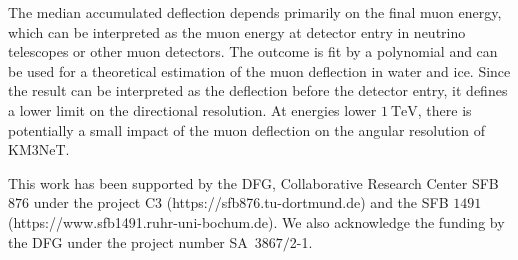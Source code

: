 The median accumulated deflection depends primarily on the final muon energy, which can be interpreted as the muon energy at detector entry 
in neutrino telescopes or other muon detectors.
The outcome is fit by a polynomial and can be used for 
a theoretical estimation of the muon deflection in water and ice.
Since the result can be interpreted as the deflection before the detector entry, it defines a lower limit on the directional resolution.
At energies lower $\SI{1}{\tera\electronvolt}$, there is potentially a small impact of the muon deflection on the angular 
resolution of KM3NeT.


\begin{acknowledgement}
  This work has been supported by the DFG, Collaborative Research Center SFB $876$
  under the project C3 
  (https://sfb876.tu-dortmund.de) and the SFB $1491$ (https://www.sfb1491.ruhr-uni-bochum.de).
  We also acknowledge the funding by the DFG under the project number SA~$3867/$2-1.
\end{acknowledgement}

